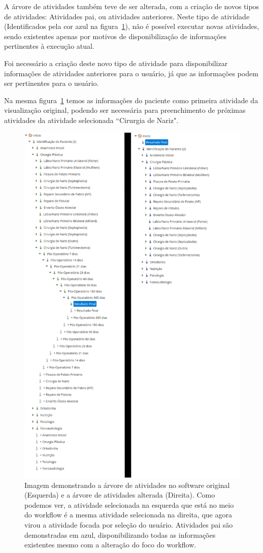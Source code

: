 A árvore de atividades também teve de ser alterada, com a criação de novos tipos de atividades: Atividades pai, ou atividades anteriores. Neste tipo de atividade (Identificados pela cor azul na figura~\ref{fig:centrare_tree_normal_altered}), não é possível executar novas atividades, sendo existentes apenas por motivos de disponibilização de informações pertinentes à execução atual.

Foi necessário a criação deste novo tipo de atividade para disponibilizar informações de atividades anteriores para o usuário, já que as informações podem ser pertinentes para o usuário.

Na mesma figura~\ref{fig:centrare_tree_normal_altered} temos as informações do paciente como primeira atividade da visualização original, podendo ser necessária para preenchimento de próximas atividades da atividade selecionada ``Cirurgia de Nariz".

\begin{figure}
    \centering
    \includegraphics[height=1\textwidth]{imgs/CENTRARE/arvoreNormalEAlterada.png}
    \caption{Imagem demonstrando a árvore de atividades no software original (Esquerda) e a árvore de atividades alterada (Direita). Como podemos ver, a atividade selecionada na esquerda que está no meio do workflow é a mesma atividade selecionada na direita, que agora virou a atividade focada por seleção do usuário. Atividades pai são demonstradas em azul, disponibilizando todas as informações existentes mesmo com a alteração do foco do workflow.}
    \label{fig:centrare_tree_normal_altered}
\end{figure}

